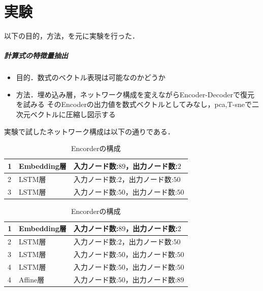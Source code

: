 \documentclass[a4j,11pt,report]{jsbook}
\begin{document}
\section{実験}
以下の目的，方法，を元に実験を行った．
\subparagraph{計算式の特徴量抽出}
\begin{itemize}
  \item 目的．数式のベクトル表現は可能なのかどうか
  \item 方法．埋め込み層，ネットワーク構成を変えながらEncoder-Decoderで復元を試みる
  そのEncoderの出力値を数式ベクトルとしてみなし，pca,T-sneで二次元ベクトルに圧縮し図示する
\end{itemize}

実験で試したネットワーク構成は以下の通りである．


\begin{table}[hbt]
  \begin{center}
    \caption{Encorderの構成}
    \label{table:Encorder}
    \begin{tabularx}{0.9\linewidth}{|l|l|X|}
      \hline
      1 & Embedding層 & 入力ノード数:$89$，出力ノード数:$2$ \\
      \hline
      2 & LSTM層 & 入力ノード数:$2$，出力ノード数:$50$ \\
      \hline
      3 & LSTM層 & 入力ノード数:$50$，出力ノード数:$50$ \\
      \hline
    \end{tabularx}
  \end{center}
\end{table}


\begin{table}[hbt]
  \begin{center}
    \caption{Encorderの構成}
    \label{table:Decorder}
    \begin{tabularx}{0.9\linewidth}{|l|l|X|}
      \hline
      1 & Embedding層 & 入力ノード数:$89$，出力ノード数:$2$ \\
      \hline
      2 & LSTM層 & 入力ノード数:$2$，出力ノード数:$50$ \\
      \hline
      3 & LSTM層 & 入力ノード数:$50$，出力ノード数:$50$ \\
      \hline
      4 & LSTM層 & 入力ノード数:$50$，出力ノード数:$50$ \\
      \hline
      4 & Affine層 & 入力ノード数:$50$，出力ノード数:$89$ \\
      \hline
    \end{tabularx}
  \end{center}
\end{table}
\clearpage
\end{document}
